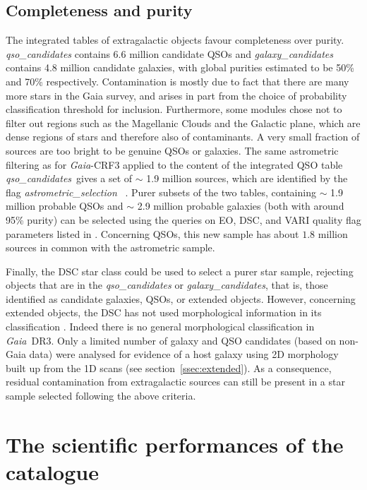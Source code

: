 \documentclass[longauth]{aa}
\newcommand\gaia{\textit{Gaia}\xspace}
\providecommand\gdrthree{\textit{Gaia}~DR3\xspace}
\begin{document}
\subsection{Completeness and purity}
The integrated  tables of extragalactic objects favour completeness over purity.  
\textit{qso\_candidates} contains 6.6 million candidate QSOs and \textit{galaxy\_candidates} contains 4.8 million candidate galaxies, with global purities estimated to be 50\% and 70\% respectively. Contamination is mostly due to fact that there are many more  stars in the Gaia survey, and arises in part from the choice of probability classification threshold for inclusion. Furthermore, some modules chose not to filter out regions  such as the Magellanic Clouds and  the Galactic plane, which are dense regions of stars and therefore also of contaminants. A very small fraction of sources are too bright to be genuine QSOs or galaxies.  The same astrometric filtering as for \gaia-CRF3 applied to the content of the integrated QSO table \textit{qso\_candidates}\ gives a set of $\sim$ 1.9 million sources, which are identified by the flag
\textit{astrometric\_selection}\
\citep{DR3-DPACP-101}.
Purer subsets of the two tables, containing $\sim $ 1.9 million probable QSOs and $\sim$ 2.9 million probable galaxies (both with around 95\% purity) can be selected using the queries on EO, DSC, and VARI quality flag parameters listed in \citet{DR3-DPACP-101}. Concerning QSOs, this new sample has about $1.8$ million sources in common with the astrometric sample. 

 Finally, the DSC star class could  be used to select a purer star sample, rejecting objects that are  in the  \textit{qso\_candidates} or \textit{galaxy\_candidates}, that is, those identified as candidate galaxies, QSOs, or extended objects. However, concerning extended objects, the DSC has not used morphological information in its classification \citep[see for details][]{DR3-DPACP-158}. Indeed there is no general morphological classification in \gdrthree. Only a limited number of galaxy  and QSO candidates  (based on non-Gaia data)  were analysed for evidence of a host galaxy using 2D morphology built up from the 1D scans (see section~\ref{ssec:extended}). As a consequence,  residual  contamination from extragalactic sources can still be present in a star sample selected following the above criteria.


\section{The scientific performances of the catalogue}\label{ssec:science}
\end{document}
